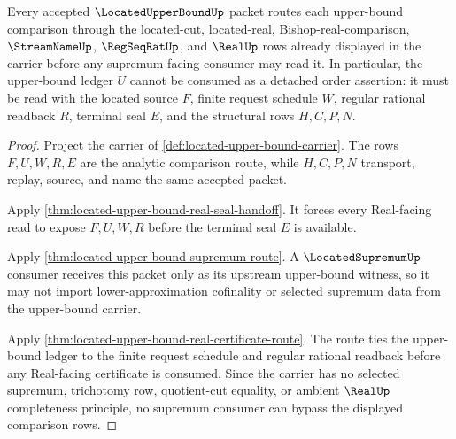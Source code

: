 \begin{theorem}
\label{thm:located-upper-bound-comparison-exactness}
Every accepted $\LocatedUpperBoundUp$ packet routes each upper-bound comparison through the located-cut, located-real, Bishop-real-comparison, $\StreamNameUp$, $\RegSeqRatUp$, and $\RealUp$ rows already displayed in the carrier before any supremum-facing consumer may read it. In particular, the upper-bound ledger $U$ cannot be consumed as a detached order assertion: it must be read with the located source $F$, finite request schedule $W$, regular rational readback $R$, terminal seal $E$, and the structural rows $H,C,P,N$.
\end{theorem}
\begin{proof}
Project the carrier of \autoref{def:located-upper-bound-carrier}. The rows $F,U,W,R,E$ are the analytic comparison route, while $H,C,P,N$ transport, replay, source, and name the same accepted packet.

Apply \autoref{thm:located-upper-bound-real-seal-handoff}. It forces every Real-facing read to expose $F,U,W,R$ before the terminal seal $E$ is available.

Apply \autoref{thm:located-upper-bound-supremum-route}. A $\LocatedSupremumUp$ consumer receives this packet only as its upstream upper-bound witness, so it may not import lower-approximation cofinality or selected supremum data from the upper-bound carrier.

Apply \autoref{thm:located-upper-bound-real-certificate-route}. The route ties the upper-bound ledger to the finite request schedule and regular rational readback before any Real-facing certificate is consumed. Since the carrier has no selected supremum, trichotomy row, quotient-cut equality, or ambient $\RealUp$ completeness principle, no supremum consumer can bypass the displayed comparison rows.
\end{proof}


